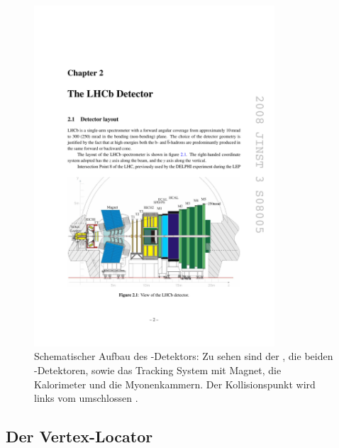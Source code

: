 \begin{figure}[htpb]
	\centering
		\includegraphics[width=0.8\textwidth]{fig/det_plot.pdf}
	\caption{Schematischer Aufbau des \lhcb-Detektors: Zu sehen sind der \velo, die beiden \rich-Detektoren, sowie das Tracking System mit Magnet, die Kalorimeter und die Myonenkammern. Der Kollisionspunkt wird links vom \velo umschlossen \cite{Alves:2008zz}.}
	\label{fig:det_plot} 
\end{figure} 

\subsection{Der Vertex-Locator}\label{sec:velo}


